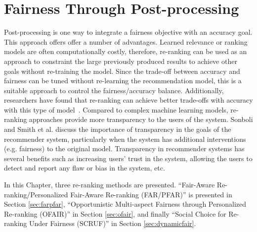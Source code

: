 \chapter{Fairness Through Post-processing}
\label{ch:fairness_postproc}

Post-processing is one way to integrate a fairness objective with an accuracy goal. This approach offers offer a number of advantages. Learned relevance or ranking models are often computationally costly, therefore, re-ranking can be used as an approach to constraint the large previously produced results to achieve other goals without re-training the model. Since the trade-off between accuracy and fairness can be tuned without re-learning the recommendation model, this is a suitable approach to control the fairness/accuracy balance. Additionally, researchers have found that re-ranking can achieve better trade-offs with accuracy with this type of model~\cite{abdollahpouri2019managing,liu2019personalized}. Compared to complex machine learning models, re-ranking approaches provide more transparency to the users of the system. Sonboli and Smith et al. \cite{Sonboli2021transparency} discuss the importance of transparency in the goals of the recommender system, particularly when the system has additional interventions (e.g. fairness) to the original model. Transparency in recommender systems has several benefits such as increasing users' trust in the system, allowing the users to detect and report any flaw or bias in the system, etc.

In this Chapter, three re-ranking methods are presented. ``Fair-Aware Re-ranking/Personalized Fair-Aware Re-ranking (FAR/PFAR)'' is presented in Section \ref{sec:farpfar}, ``Opportunistic Multi-aspect Fairness through Personalized Re-ranking (OFAIR)'' in Section \ref{sec:ofair}, and finally ``Social Choice for Re-ranking Under Fairness (SCRUF)'' in Section \ref{sec:dynamicfair}.





